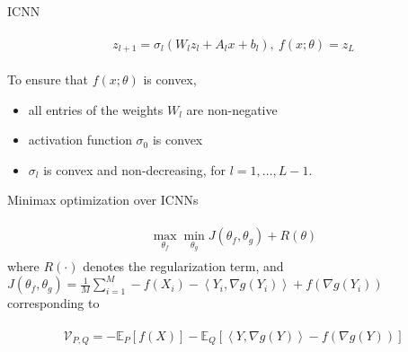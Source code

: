 \documentclass{beamer}		%
\begin{document}
\begin{frame}{ICNN}


\begin{eqnarray}
\begin{aligned}
z_{l+1}=\sigma_l(W_lz_l+A_lx+b_l),\ f(x;\theta)=z_L
\end{aligned}    
\end{eqnarray}

To ensure that $f(x;\theta)$ is convex, 

\begin{itemize}
    \item all entries of the weights $W_l$ are non-negative
    \item activation function $\sigma_0$ is convex
    \item $\sigma_l$ is convex and non-decreasing, for $l = 1,\ldots,L-1$.
\end{itemize}

\end{frame}







\begin{frame}{Minimax optimization over ICNNs}


\begin{eqnarray}
\begin{aligned}
\max_{\theta_f} \min_{\theta_g} J(\theta_f, \theta_g) + R(\theta)
\end{aligned}    
\end{eqnarray}
where $R(\cdot)$ denotes the regularization term, and $J(\theta_f, \theta_g)=\frac{1}{M} \sum_{i=1}^{M} - f(X_i) - \left \langle Y_i, \nabla g(Y_i)\right \rangle + f(\nabla g(Y_i)) $ corresponding to 

\begin{eqnarray*}
\begin{aligned}
\mathcal{V}_{P,Q}=-\mathbb{E}_P[f(X)]-\mathbb{E}_Q \left[\left \langle Y,\nabla g(Y) \right \rangle - f(\nabla g(Y)) \right]
\end{aligned}    
\end{eqnarray*}




\end{frame}
\end{document}
